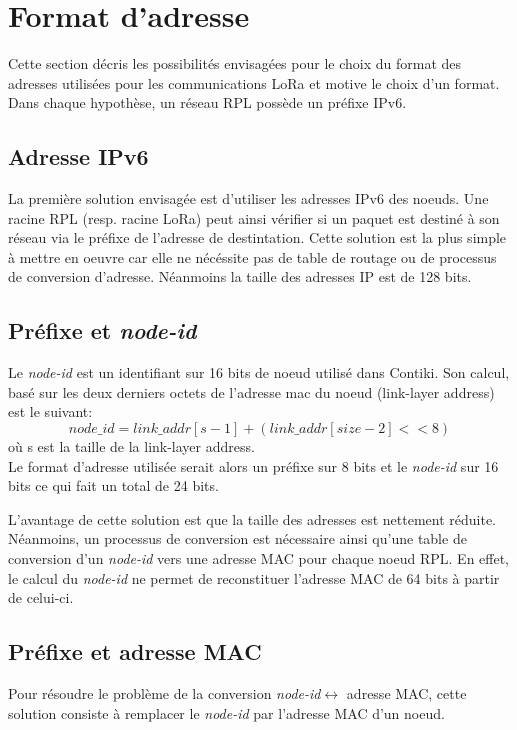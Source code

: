 \section{Format d'adresse}\label{sec:archi-adresses}
\renewcommand{\rightmark}{Format d'adresse}

Cette section décris les possibilités envisagées pour le choix du format des adresses utilisées pour les communications LoRa et motive le choix d'un format. Dans chaque hypothèse, un réseau RPL possède un préfixe IPv6.

\subsection*{Adresse IPv6}
    La première solution envisagée est d'utiliser les adresses IPv6 des noeuds.
    Une racine RPL (resp. racine LoRa) peut ainsi vérifier si un paquet est destiné à son réseau
    via le préfixe de l'adresse de destintation.
    Cette solution est la plus simple à mettre en oeuvre car elle ne nécéssite pas de table de routage ou de processus de conversion d'adresse. Néanmoins la taille des adresses IP est de 128 bits.

\subsection*{Préfixe et \textit{node-id}}
    Le \textit{node-id} est un identifiant sur 16 bits de noeud utilisé dans Contiki. Son calcul, basé sur les deux derniers octets de l'adresse mac du noeud (link-layer address) est le suivant:
    \[
        node\_id = link\_addr[s-1] + (link\_addr[size -2] << 8)
    \]
    où s est la taille de la link-layer address.\\

    Le format d'adresse utilisée serait alors un préfixe sur 8 bits et le \textit{node-id} sur 16 bits ce qui fait un total de 24 bits.

    L'avantage de cette solution est que la taille des adresses est nettement réduite. Néanmoins, un processus de conversion est nécessaire ainsi qu'une table de conversion d'un \textit{node-id} vers une adresse MAC pour chaque noeud RPL. En effet, le calcul du \textit{node-id} ne permet de reconstituer l'adresse MAC de 64 bits à partir de celui-ci.

\subsection*{Préfixe et adresse MAC}
    Pour résoudre le problème de la conversion \textit{node-id}$\leftrightarrow	$ adresse MAC, cette solution consiste à remplacer le \textit{node-id} par l'adresse MAC d'un noeud.

